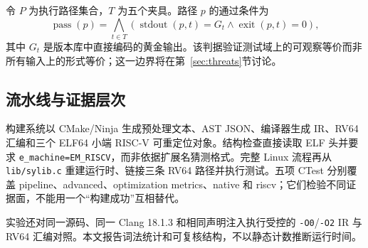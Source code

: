 令 $P$ 为执行路径集合，$T$ 为五个夹具。路径 $p$ 的通过条件为
\begin{equation}
 \operatorname{pass}(p)=\bigwedge_{t\in T}
 \left(\operatorname{stdout}(p,t)=G_t \land \operatorname{exit}(p,t)=0\right),
\end{equation}
其中 $G_t$ 是版本库中直接编码的黄金输出。该判据验证测试域上的可观察等价而非所有输入上的形式等价；这一边界将在第~\ref{sec:threats}节讨论。

\subsection{流水线与证据层次}

构建系统以 CMake/Ninja 生成预处理文本、AST JSON、编译器生成 IR、RV64 汇编和三个 ELF64 小端 RISC-V 可重定位对象。结构检查直接读取 ELF 头并要求 \texttt{e\_machine=EM\_RISCV}，而非依据扩展名猜测格式。完整 Linux 流程再从 \texttt{lib/sylib.c} 重建运行时、链接三条 RV64 路径并执行测试。五项 CTest 分别覆盖 pipeline、advanced、optimization metrics、native 和 riscv；它们检验不同证据面，不能用一个“构建成功”互相替代。

实验还对同一源码、同一 Clang 18.1.3 和相同声明注入执行受控的 \texttt{-O0}/\texttt{-O2} IR 与 RV64 汇编对照。本文报告词法统计和可复核结构，不以静态计数推断运行时间。
